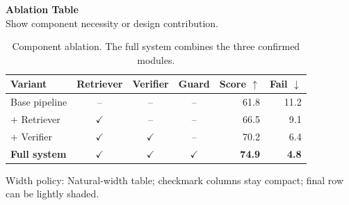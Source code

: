 \documentclass[10pt]{article}
\begin{document}
{\large\textbf{Ablation Table}}\\[-0.05em]
{\footnotesize\textcolor{GroupText}{Show component necessity or design contribution.}}\\[0.35em]
\begin{table}[H]
\centering
\caption{Component ablation. The full system combines the three confirmed modules.}
\label{tab:ablation}
\small
\begin{tabular}{@{}lccc rr@{}}
\toprule
\rowcolor{HeaderTint}
\textbf{Variant} & \textbf{Retriever} & \textbf{Verifier} & \textbf{Guard} &
\textbf{Score $\uparrow$} & \textbf{Fail $\downarrow$} \\
\midrule
Base pipeline & -- & -- & -- & 61.8 & 11.2 \\
+ Retriever & $\checkmark$ & -- & -- & 66.5 & 9.1 \\
+ Verifier & $\checkmark$ & $\checkmark$ & -- & 70.2 & 6.4 \\
\midrule
\rowcolor{FocusRow}
\textbf{Full system} & $\checkmark$ & $\checkmark$ & $\checkmark$ &
\textbf{74.9} & \textbf{4.8} \\
\bottomrule
\end{tabular}
\end{table}
\vfill
{\footnotesize\textcolor{GroupText}{Width policy: Natural-width table; checkmark columns stay compact; final row can be lightly shaded.}}
\end{document}
